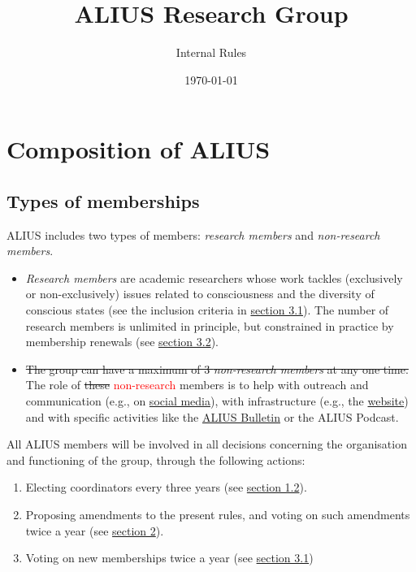 \documentclass[a4paper, 11pt]{scrartcl}
\begin{document}
\title{\vspace{-2cm} \LARGE ALIUS Research Group}
\subtitle{\Large Internal Rules}
\author{}
\date{\large \today}
\maketitle

\section{Composition of ALIUS}
\subsection{Types of memberships}

ALIUS includes two types of members: \emph{research members} and \emph{non-research members}.

\begin{itemize}

\item \emph{Research members} are academic researchers whose work tackles (exclusively or non-exclusively) issues related to consciousness and the diversity of conscious states (see the inclusion criteria in \hyperref[new_memberships]{section 3.1}). The number of research members is unlimited in principle, but constrained in practice by membership renewals (see \hyperref[membership_renewal]{section 3.2}). 

\item \sout{The group can have a maximum of 3 \emph{non-research members} at any one time.} The role of \sout{these} \textcolor{red}{non-research} members is to help with outreach and communication (e.g., on \href{https://www.facebook.com/aliusresearch/}{social media}), with infrastructure (e.g., the \href{https://www.aliusresearch.org/}{website}) and with specific activities like the \href{https://www.aliusresearch.org/bulletin.html}{ALIUS Bulletin} or the ALIUS Podcast.


\end{itemize}

\noindent All ALIUS members will be involved in all decisions concerning the organisation and functioning of the group, through the following actions:

\begin{enumerate}
\item Electing coordinators every three years (see \hyperref[coordinators]{section 1.2}).
\item Proposing amendments to the present rules, and voting on such amendments twice a year (see \hyperref[modif]{section 2}).
\item Voting on new memberships twice a year (see \hyperref[new_memberships]{section 3.1})

\end{enumerate}
\end{document}
